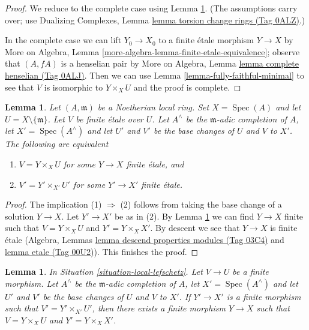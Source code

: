 \documentclass{amsart}
\theoremstyle{plain}
\newtheorem{lemma}[subsection]{Lemma}
\theoremstyle{definition}
\theoremstyle{remark}
\numberwithin{equation}{subsection}
\def\Spec{\mathop{\mathrm{Spec}}}
\begin{document}
\begin{proof}
We reduce to the complete case using Lemma \ref{lemma-purity-and-completion}.
(The assumptions carry over; use Dualizing Complexes, Lemma
\href{https://stacks.math.columbia.edu/tag/0ALZ}{lemma torsion change rings (Tag 0ALZ)}.)

\medskip\noindent
In the complete case we can lift $Y_0 \to X_0$ to a finite \'etale
morphism $Y \to X$ by
More on Algebra, Lemma \ref{more-algebra-lemma-finite-etale-equivalence};
observe that $(A, fA)$ is a henselian pair by
More on Algebra, Lemma \href{https://stacks.math.columbia.edu/tag/0ALJ}{lemma complete henselian (Tag 0ALJ)}.
Then we can use Lemma \ref{lemma-fully-faithful-minimal}
to see that $V$ is isomorphic to $Y \times_X U$ and
the proof is complete.
\end{proof}


\begin{lemma}
\label{lemma-purity-and-completion}
Let $(A, \mathfrak m)$ be a Noetherian local ring. Set $X = \Spec(A)$
and let $U = X \setminus \{\mathfrak m\}$.
Let $V$ be finite \'etale over $U$.
Let $A^\wedge$ be the $\mathfrak m$-adic completion of $A$,
let $X' = \Spec(A^\wedge)$ and let $U'$ and $V'$ be the base changes of
$U$ and $V$ to $X'$. The following are equivalent
\begin{enumerate}
\item $V = Y \times_X U$ for some $Y \to X$ finite \'etale, and
\item $V' = Y' \times_{X'} U'$ for some $Y' \to X'$ finite \'etale.
\end{enumerate}
\end{lemma}

\begin{proof}
The implication (1) $\Rightarrow$ (2) follows from taking the base change
of a solution $Y \to X$. Let $Y' \to X'$ be as in (2).
By Lemma \ref{lemma-fill-in-missing} we can find $Y \to X$ finite
such that $V = Y \times_X U$ and $Y' = Y \times_X X'$.
By descent we see that $Y \to X$ is finite \'etale
(Algebra, Lemmas \href{https://stacks.math.columbia.edu/tag/03C4}{lemma descend properties modules (Tag 03C4)} and
\href{https://stacks.math.columbia.edu/tag/00U2}{lemma etale (Tag 00U2)}). This finishes the proof.
\end{proof}


\begin{lemma}
\label{lemma-fill-in-missing}
In Situation \ref{situation-local-lefschetz}. Let $V \to U$ be a finite
morphism.  Let $A^\wedge$ be the $\mathfrak m$-adic completion of $A$,
let $X' = \Spec(A^\wedge)$ and let $U'$ and $V'$ be the base changes of
$U$ and $V$ to $X'$. If $Y' \to X'$ is a finite morphism such that
$V' = Y' \times_{X'} U'$, then there exists a finite morphism $Y \to X$
such that $V = Y \times_X U$ and $Y' = Y \times_X X'$.
\end{lemma}
\end{document}
